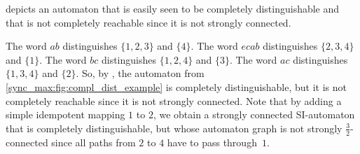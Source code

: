 \begin{example} \label{sync_max:ex:compl-dist-non-cr2}
	depicts an automaton that is easily seen
	to be completely distinguishable
	and that is not completely reachable
	since it is not strongly connected.
\end{example}

\begin{example} \label{syncmax:ex:compl-dist-not-SCC}
	The word $ab$ distinguishes $\{1,2,3\}$ and $\{4\}$.
	The word $ecab$ distinguishes $\{2,3,4\}$ and $\{1\}$.
	The word $bc$ distinguishes $\{1,2,4\}$ and $\{3\}$.
	The word $ac$ distinguishes $\{1,3,4\}$ and $\{2\}$.
	So, by ,
	the automaton from \cref{sync_max:fig:compl_dist_example} is completely distinguishable,
	but it is not completely reachable since it is not strongly connected.
	Note that by adding a simple idempotent mapping $1$ to $2$, we obtain
	a strongly connected SI-automaton that is completely distinguishable,
	but whose automaton graph is not strongly $\frac{3}{2}$-connected
	since all paths from $2$ to $4$ have to pass through~$1$.
\end{example}

